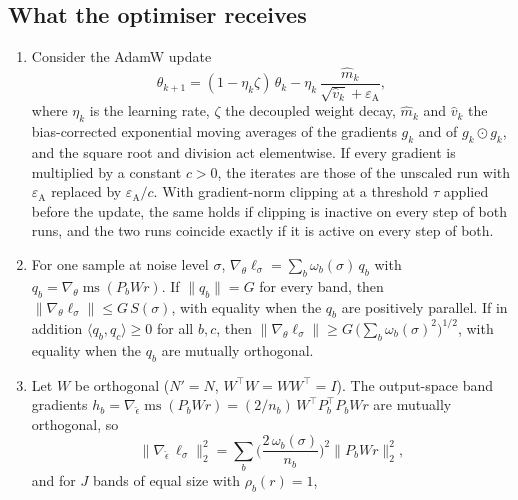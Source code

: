 \subsection{What the optimiser receives}
\label{app:scale}

\begin{proposition}
\label{prop:scale}
\begin{enumerate}
  \item[(a)] Consider the AdamW update
  \begin{equation}
    \theta_{k+1} = (1 - \eta_k\zeta)\,\theta_k
      - \eta_k\,\frac{\hat m_k}{\sqrt{\hat v_k} + \varepsilon_{\mathrm{A}}},
    \label{eq:adamw}
  \end{equation}
  where $\eta_k$ is the learning rate, $\zeta$ the decoupled weight decay,
  $\hat m_k$ and $\hat v_k$ the bias-corrected exponential moving averages of
  the gradients $g_k$ and of $g_k \odot g_k$, and the square root and division
  act elementwise. If every gradient is multiplied by a constant $c > 0$, the
  iterates are those of the unscaled run with $\varepsilon_{\mathrm{A}}$
  replaced by $\varepsilon_{\mathrm{A}}/c$. With gradient-norm clipping at a
  threshold $\tau$ applied before the update, the same holds if clipping is
  inactive on every step of both runs, and the two runs coincide exactly if it
  is active on every step of both.
  \item[(b)] For one sample at noise level $\sigma$,
  $\nabla_\theta \ell_\sigma = \sum_b \omega_b(\sigma)\, q_b$ with
  $q_b = \nabla_\theta \operatorname{ms}(P_b W r)$. If $\lVert q_b \rVert = G$ for
  every band, then $\lVert \nabla_\theta \ell_\sigma \rVert \le G\,S(\sigma)$, with
  equality when the $q_b$ are positively parallel. If in addition
  $\langle q_b, q_c \rangle \ge 0$ for all $b, c$, then
  $\lVert \nabla_\theta \ell_\sigma \rVert \ge G\,\big(\sum_b \omega_b(\sigma)^2\big)^{1/2}$,
  with equality when the $q_b$ are mutually orthogonal.
  \item[(c)] Let $W$ be orthogonal ($N' = N$, $W^\top W = W W^\top = I$). The
  output-space band gradients
  $h_b = \nabla_{\hat\epsilon} \operatorname{ms}(P_b W r) = (2/n_b)\, W^\top P_b^\top P_b W r$
  are mutually orthogonal, so
  \begin{equation}
    \lVert \nabla_{\hat\epsilon}\, \ell_\sigma \rVert_2^2
    = \sum_b \Big(\frac{2\,\omega_b(\sigma)}{n_b}\Big)^2 \lVert P_b W r \rVert_2^2 ,
    \label{eq:gradnorm}
  \end{equation}
  and for $J$ bands of equal size with $\rho_b(r) = 1$,

\end{enumerate}
\end{proposition}
